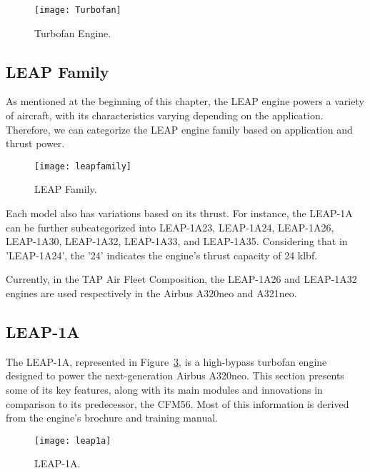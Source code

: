 \begin{figure}[H]
    \centering
    \texttt{[image: Turbofan]}
    \caption{Turbofan Engine. \cite{Aainsqatsi2008}}
    \label{fig:turbofan}
\end{figure}

\subsection{LEAP Family}
\label{subsec:leapfamily}
As mentioned at the beginning of this chapter, the LEAP engine powers a variety of aircraft, with its characteristics varying depending on the application. 
Therefore, we can categorize the \gls{LEAP} engine family based on application and thrust power.

\begin{figure}[H]
    \centering
    \texttt{[image: leapfamily]}
    \caption{\gls{LEAP} Family.\cite{brochureleap}}
    \label{fig:leapfamily}
\end{figure}

Each model also has variations based on its thrust. For instance, the \gls{LEAP}-1A can be further subcategorized into \gls{LEAP}-1A23, \gls{LEAP}-1A24, \gls{LEAP}-1A26, \gls{LEAP}-1A30, \gls{LEAP}-1A32, \gls{LEAP}-1A33, and \gls{LEAP}-1A35. 
Considering that in '\gls{LEAP}-1A24', the '24' indicates the engine's thrust capacity of 24 klbf.

Currently, in the \gls{TAP} Air Fleet Composition, the LEAP-1A26 and LEAP-1A32 engines are used respectively in the Airbus A320neo and A321neo.


\subsection{LEAP-1A}
\label{subsec:leap1a}

The \gls{LEAP}-1A, represented in Figure~\ref{fig:leap1a}, is a high-bypass turbofan engine designed to power the next-generation Airbus A320neo. This section presents some of its key features, along with its main modules and innovations in comparison to its predecessor, the CFM56. Most of this information is derived from the engine’s brochure and training manual.

\begin{figure}[H]
    \centering
    \texttt{[image: leap1a]}
    \caption{\gls{LEAP}-1A.\cite{brochureleap}}
    \label{fig:leap1a}
\end{figure}

